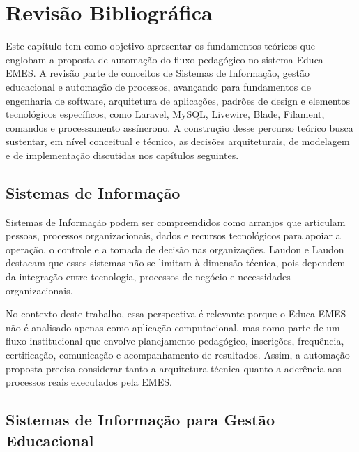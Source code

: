%

\chapter{Revisão Bibliográfica}
\label{sec:revbib}

Este capítulo tem como objetivo apresentar os fundamentos teóricos que englobam a proposta de
automação do fluxo pedagógico no sistema Educa EMES. A revisão parte de
conceitos de Sistemas de Informação, gestão educacional e automação de
processos, avançando para fundamentos de engenharia de software, arquitetura de
aplicações, padrões de design e elementos tecnológicos específicos, como
Laravel, MySQL, Livewire, Blade, Filament, comandos e processamento assíncrono.
A construção desse percurso teórico busca sustentar, em nível conceitual e
técnico, as decisões arquiteturais, de modelagem e de implementação discutidas
nos capítulos seguintes.

\section{Sistemas de Informação}
\label{sec:revbib:sistemas-informacao}

Sistemas de Informação podem ser compreendidos como arranjos que articulam
pessoas, processos organizacionais, dados e recursos tecnológicos para apoiar a
operação, o controle e a tomada de decisão nas organizações. Laudon e Laudon
\cite{LaudonLaudon2022} destacam que esses sistemas não se limitam à dimensão
técnica, pois dependem da integração entre tecnologia, processos de negócio e
necessidades organizacionais.

No contexto deste trabalho, essa perspectiva é relevante porque o Educa EMES
não é analisado apenas como aplicação computacional, mas como parte de um fluxo
institucional que envolve planejamento pedagógico, inscrições, frequência,
certificação, comunicação e acompanhamento de resultados. Assim, a automação
proposta precisa considerar tanto a arquitetura técnica quanto a aderência aos
processos reais executados pela EMES.

\section{Sistemas de Informação para Gestão Educacional}
\label{sec:revbib:gestao-educacional}

